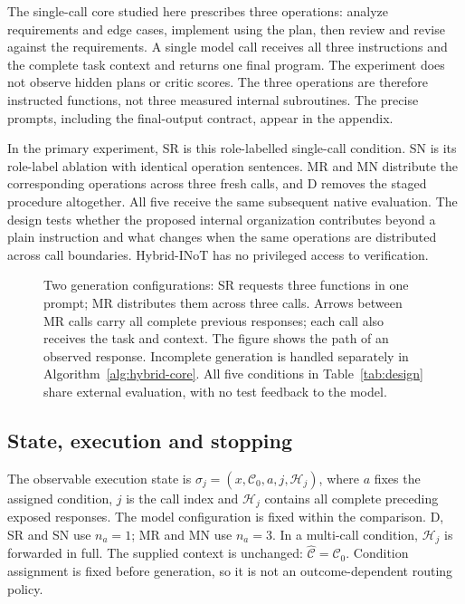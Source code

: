 The single-call core studied here prescribes three operations: analyze requirements and edge cases, implement using the plan, then review and revise against the requirements. A single model call receives all three instructions and the complete task context and returns one final program. The experiment does not observe hidden plans or critic scores. The three operations are therefore instructed functions, not three measured internal subroutines. The precise prompts, including the final-output contract, appear in the appendix.

In the primary experiment, SR is this role-labelled single-call condition. SN is its role-label ablation with identical operation sentences. MR and MN distribute the corresponding operations across three fresh calls, and D removes the staged procedure altogether. All five receive the same subsequent native evaluation. The design tests whether the proposed internal organization contributes beyond a plain instruction and what changes when the same operations are distributed across call boundaries. Hybrid-INoT has no privileged access to verification.

\begin{figure}[htbp]\centering

\caption{Two generation configurations: SR requests three functions in one prompt; MR distributes them across three calls. Arrows between MR calls carry all complete previous responses; each call also receives the task and context. The figure shows the path of an observed response. Incomplete generation is handled separately in Algorithm~\ref{alg:hybrid-core}. All five conditions in Table~\ref{tab:design} share external evaluation, with no test feedback to the model.}
\label{fig:hybrid-core}
\end{figure}
\FloatBarrier

\subsection{State, execution and stopping}
The observable execution state is $\sigma_j=(x,\mathcal{C}_0,a,j,\mathcal{H}_j)$, where $a$ fixes the assigned condition, $j$ is the call index and $\mathcal{H}_j$ contains all complete preceding exposed responses. The model configuration is fixed within the comparison. D, SR and SN use $n_a=1$; MR and MN use $n_a=3$. In a multi-call condition, $\mathcal{H}_j$ is forwarded in full. The supplied context is unchanged: $\widehat{\mathcal{C}}=\mathcal{C}_0$. Condition assignment is fixed before generation, so it is not an outcome-dependent routing policy.

